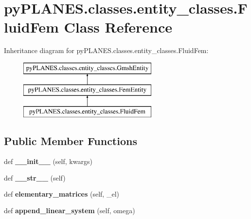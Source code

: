 \hypertarget{classpy_p_l_a_n_e_s_1_1classes_1_1entity__classes_1_1_fluid_fem}{}\section{py\+P\+L\+A\+N\+E\+S.\+classes.\+entity\+\_\+classes.\+Fluid\+Fem Class Reference}
\label{classpy_p_l_a_n_e_s_1_1classes_1_1entity__classes_1_1_fluid_fem}
Inheritance diagram for py\+P\+L\+A\+N\+E\+S.\+classes.\+entity\+\_\+classes.\+Fluid\+Fem\+:\begin{figure}[H]
\begin{center}
\leavevmode
\includegraphics[height=3.000000cm]{classpy_p_l_a_n_e_s_1_1classes_1_1entity__classes_1_1_fluid_fem}
\end{center}
\end{figure}
\subsection*{Public Member Functions}
\begin{DoxyCompactItemize}
\item 
\mbox{\label{classpy_p_l_a_n_e_s_1_1classes_1_1entity__classes_1_1_fluid_fem_a719ab79825fef3cff63deb22f46be94f}} 
def {\bfseries \+\_\+\+\_\+init\+\_\+\+\_\+} (self, kwargs)
\item 
\mbox{\label{classpy_p_l_a_n_e_s_1_1classes_1_1entity__classes_1_1_fluid_fem_af7fdbd6e5fbfbe6f04e105338dbdf8ed}} 
def {\bfseries \+\_\+\+\_\+str\+\_\+\+\_\+} (self)
\item 
\mbox{\label{classpy_p_l_a_n_e_s_1_1classes_1_1entity__classes_1_1_fluid_fem_a1bee421000201f512ba1718afef7dc6d}} 
def {\bfseries elementary\+\_\+matrices} (self, \+\_\+el)
\item 
\mbox{\label{classpy_p_l_a_n_e_s_1_1classes_1_1entity__classes_1_1_fluid_fem_acf1f23520a698cf1b5586ec49ae18e21}} 
def {\bfseries append\+\_\+linear\+\_\+system} (self, omega)
\end{DoxyCompactItemize}
